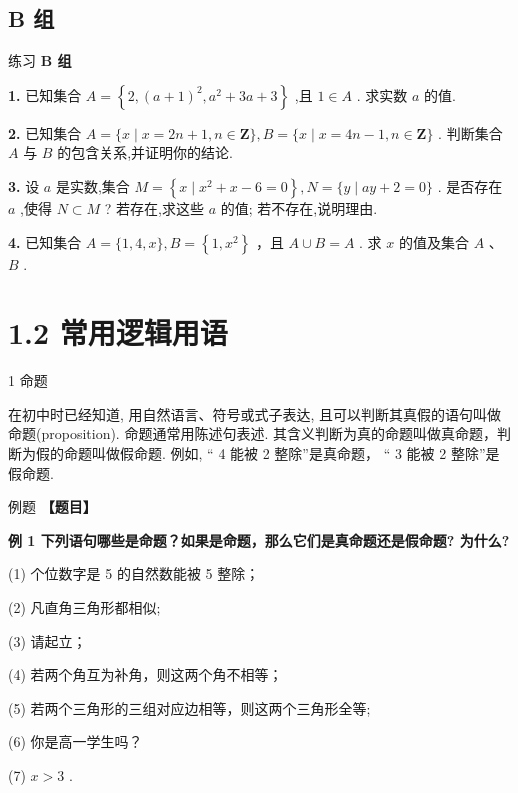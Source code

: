 \documentclass[a4paper,10pt,oneside,fontset=none]{ctexbook}
\newcounter{example}[chapter]
\newenvironment{example}[1][]{\begin{exBox}{例题}{#1}}{\end{exBox}}
\newenvironment{exercise}[1][]{\begin{exBox}{练习}{#1}}{\end{exBox}}
\numberwithin{equation}{chapter}
\begin{document}
\subsection*{B 组}

\begin{exercise}
\textbf{B 组}\par\vspace{0.5em}
\textbf{1.} 已知集合 $A = \left\{  {2,{\left( a + 1\right) }^{2},{a}^{2} + {3a} + 3}\right\}$ ,且 $1 \in  A$ . 求实数 $a$ 的值.
\par\vspace{0.8em}
\textbf{2.} 已知集合 $A = \{ x \mid  x = {2n} + 1, n \in  \mathbf{Z}\} , B = \{ x \mid  x = {4n} - 1, n \in  \mathbf{Z}\}$ . 判断集合 $A$ 与 $B$ 的包含关系,并证明你的结论.
\par\vspace{0.8em}
\textbf{3.} 设 $a$ 是实数,集合 $M = \left\{  {x \mid  {x}^{2} + x - 6 = 0}\right\}  , N = \{ y \mid  {ay} + 2 = 0\}$ . 是否存在 $a$ ,使得 $N \subset  M$ ? 若存在,求这些 $a$ 的值; 若不存在,说明理由.
\par\vspace{0.8em}
\textbf{4.} 已知集合 $A = \{ 1,4, x\} , B = \left\{  {1,{x}^{2}}\right\}$ ，且 $A \cup  B = A$ . 求 $x$ 的值及集合 $A$ 、 $B$ .
\end{exercise}

\section{1.2 常用逻辑用语}

1 命题

在初中时已经知道, 用自然语言、符号或式子表达, 且可以判断其真假的语句叫做命题(proposition). 命题通常用陈述句表述. 其含义判断为真的命题叫做真命题，判断为假的命题叫做假命题. 例如, “ 4 能被 2 整除”是真命题， “ 3 能被 2 整除”是假命题.

\begin{example}
\textbf{【题目】}\par\vspace{0.3em}
\textbf{例 1 下列语句哪些是命题？如果是命题，那么它们是真命题还是假命题? 为什么?}\par\vspace{0.3em}
\par
(1) 个位数字是 5 的自然数能被 5 整除；
\par
(2) 凡直角三角形都相似;
\par
(3) 请起立；
\par
(4) 若两个角互为补角，则这两个角不相等；
\par
(5) 若两个三角形的三组对应边相等，则这两个三角形全等;
\par
(6) 你是高一学生吗？
\par
(7)  $x > 3$ .
\end{example}
\end{document}
